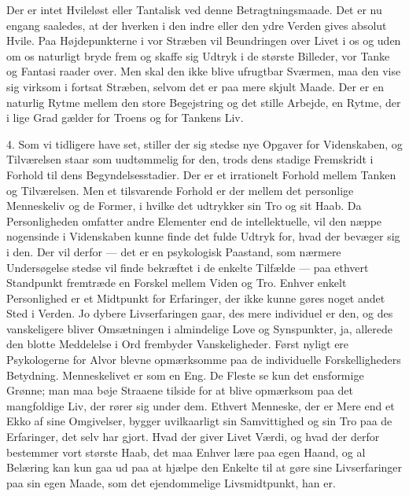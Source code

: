 \documentclass[12pt,a4paper]{article}
\newcommand{\opage}[1]{\marginnote{\footnotesize\textit{[#1]}}}
\begin{document}
Der er intet Hvileløst eller Tantalisk ved denne Betragtningsmaade. Det er nu
engang saaledes, at der hverken i den indre eller den ydre Verden gives absolut
Hvile. Paa Højdepunkterne i vor Stræben vil Beundringen over Livet i os og uden
om os naturligt bryde frem og skaffe sig Udtryk i de største Billeder, vor Tanke
og Fantasi raader over. Men skal den ikke blive ufrugtbar Sværmen, maa den vise
sig virksom i fortsat Stræben, selvom det er paa mere skjult Maade. Der er en
naturlig Rytme mellem den store Begejstring og det stille Arbejde, en Rytme, der
i lige Grad gælder for Troens og for Tankens Liv.

\medskip

4. Som vi tidligere have set, stiller der sig stedse nye Opgaver for
Videnskaben, og Tilværelsen staar som uudtømmelig for den, trods dens stadige
Fremskridt i Forhold til dens Begyndelsesstadier. Der er et irrationelt Forhold
mellem Tanken og Tilværelsen. Men et tilsvarende Forhold er der mellem det
personlige Menneskeliv og de Former, i hvilke det udtrykker sin Tro og sit Haab.
Da Personligheden omfatter andre Elementer end de intellektuelle, vil den næppe
nogensinde i Videnskaben kunne finde det fulde Udtryk for, hvad der bevæger sig
i den. Der vil derfor --- det er en psykologisk Paastand, som nærmere
Undersøgelse stedse vil finde bekræftet i de enkelte Tilfælde --- paa ethvert
Standpunkt fremtræde en Forskel mellem Viden og Tro. Enhver enkelt Personlighed
er et Midtpunkt for Erfaringer, der ikke kunne gøres noget andet Sted i Verden.
Jo dybere Livserfaringen gaar, des mere individuel er den, og des vanskeligere
bliver Omsætningen i almindelige Love og \opage{48} Synspunkter, ja, allerede den blotte
Meddelelse i Ord frembyder Vanskeligheder. Først nyligt ere Psykologerne for
Alvor blevne opmærksomme paa de individuelle Forskelligheders Betydning.
Menneskelivet er som en Eng. De Fleste se kun det ensformige Grønne; man maa
bøje Straaene tilside for at blive opmærksom paa det mangfoldige Liv, der rører
sig under dem. Ethvert Menneske, der er Mere end et Ekko af sine Omgivelser,
bygger uvilkaarligt sin Samvittighed og sin Tro paa de Erfaringer, det selv har
gjort. Hvad der giver Livet Værdi, og hvad der derfor bestemmer vort største
Haab, det maa Enhver lære paa egen Haand, og al Belæring kan kun gaa ud paa at
hjælpe den Enkelte til at gøre sine Livserfaringer paa sin egen Maade, som det
ejendommelige Livsmidtpunkt, han er.
\end{document}
